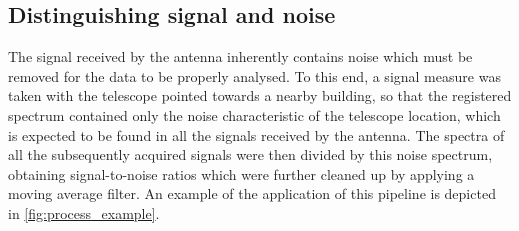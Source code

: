 \subsection{Distinguishing signal and noise}
The signal received by the antenna inherently contains noise which must be removed for the data to be properly analysed.
To this end, a signal measure was taken with the telescope pointed towards a nearby building, so that the registered spectrum  contained only the noise characteristic of the telescope location, which is expected to be found in all the signals received by the antenna.
The spectra of all the subsequently acquired signals were then divided by this noise spectrum, obtaining  signal-to-noise ratios which were further cleaned up by applying a moving average filter.
An example of the application of this pipeline is depicted in \autoref{fig:process_example}.
